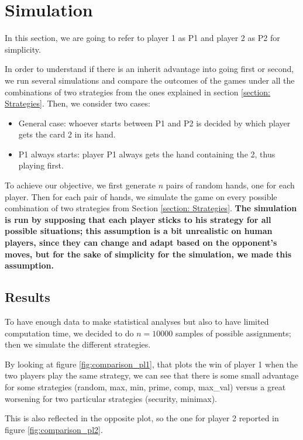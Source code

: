 \section{Simulation} \label{section:Simulation} %
In this section, we are going to refer to player 1 as P1 and player 2 as P2 for simplicity.

In order to understand if there is an inherit advantage into going first or second, we run several simulations and compare the outcomes of the games under all the combinations of two strategies from the ones explained in section \ref{section: Strategies}. Then, we consider two cases:
\begin{itemize}
    \item General case: whoever starts between P1 and P2 is decided by which player gets the card 2 in its hand.
    \item P1 always starts: player P1 always gets the hand containing the 2, thus playing first.
\end{itemize}
To achieve our objective, we first generate $n$ pairs of random hands, one for each player. Then for each pair of hands, we simulate the game on every possible combination of two strategies from Section \ref{section: Strategies}. \textbf{The simulation is run by supposing that each player sticks to his strategy for all possible situations; this assumption is a bit unrealistic on human players, since they can change and adapt based on the opponent's moves, but for the sake of simplicity for the simulation, we made this assumption.}

\subsection{Results} \label{subsection:Results}
To have enough data to make statistical analyses but also to have limited computation time, we decided to do $n = 10000$ samples of possible assignments; then we simulate the different strategies.

By looking at figure \ref{fig:comparison_pl1}, that plots the win of player 1 when the two players play the same strategy, we can see that there is some small advantage for some strategies (random, max, min, prime, comp, max\_val) versus a great worsening for two particular strategies (security, minimax).

This is also reflected in the opposite plot, so the one for player 2 reported in figure \ref{fig:comparison_pl2}.


